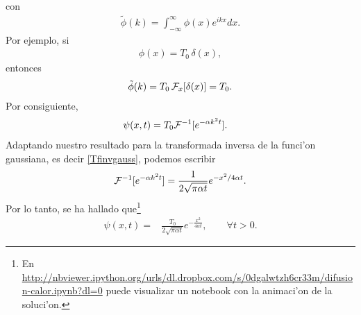 con
\begin{align}
\tilde{\phi}(k)=\int_{-\infty}^{\infty}\phi(x)e^{ikx}dx.
\end{align}
Por ejemplo, si
\begin{align}
\phi(x)=T_{0}\,\delta(x),
\end{align}
entonces
\begin{align}
\tilde{\phi}(k)=T_{0}\,{\cal F}_{x}[\delta(x)]=T_{0}.
\end{align}
Por consiguiente,
\begin{align}
\psi(x,t) &= T_{0}{\cal F}^{-1}[e^{-\alpha k^2 t}].
\end{align}
Adaptando nuestro resultado para la transformada inversa de la funci'on gaussiana, es decir \eqref{Tfinvgauss}, podemos escribir
\begin{align}
{\cal F}^{-1}[e^{-\alpha k^2 t}] = \frac{1}{2\sqrt{\pi\alpha t}}e^{-x^2/4\alpha t}.
\end{align}
Por lo tanto, se ha hallado que\footnote{En \url{http://nbviewer.ipython.org/urls/dl.dropbox.com/s/0dgalwtzh6cr33m/difusion-calor.ipynb?dl=0} puede visualizar un notebook con la animaci'on de la soluci'on.}
\begin{align}
\psi(x,t)=&\frac{T_{0}}{2\sqrt{\pi \alpha t}}e^{-\frac{x^2}{4 \alpha t}},\qquad \forall t>0.
\end{align}
